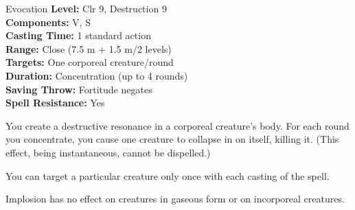 {Evocation}
{
	\textbf{Level:}
	Clr 9, Destruction 9\\
	\textbf{Components:}
	V, S\\
	\textbf{Casting Time:}
	1 standard action\\
	\textbf{Range:}
	Close (7.5 m + 1.5 m/2 levels)\\
	\textbf{Targets:}
	One corporeal creature/round\\
	\textbf{Duration:}
	Concentration (up to 4 rounds)\\
	\textbf{Saving Throw:}
	Fortitude negates\\
	\textbf{Spell Resistance:}
	Yes\\
}
{
	You create a destructive resonance in a corporeal creature's body. For each round you concentrate, you cause one creature to collapse in on itself, killing it. (This effect, being instantaneous, cannot be dispelled.)

	You can target a particular creature only once with each casting of the spell.

	Implosion has no effect on creatures in gaseous form or on incorporeal creatures.

}
